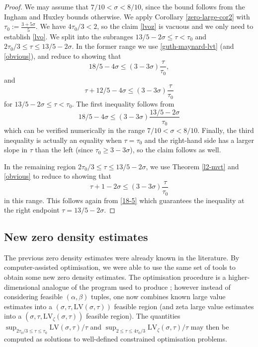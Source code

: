 \documentclass[a4paper, 10pt]{amsart}
\newcommand{\LV}{\mathrm{LV}}
\begin{document}
\begin{proof} We may assume that $7/10 < \sigma < 8/10$, since the bound follows from the Ingham and Huxley bounds otherwise.  We apply Corollary \ref{zero-large-cor2} with $\tau_0 := \frac{3+5\sigma}{5}$.  We have $4\tau_0/3 < 2$, so the claim \eqref{lvoz} is vacuous and we only need to establish \eqref{lvo}.  We split into the subranges $13/5-2\sigma \leq \tau < \tau_0$ and $2\tau_0/3 \leq \tau \leq 13/5-2\sigma$. In the former range we use \eqref{guth-maynard-lvt} (and \eqref{obvious}), and reduce to showing that
$$ 18/5 - 4 \sigma \leq (3-3\sigma) \frac{\tau}{\tau_0},$$
and
$$ \tau + 12/5 - 4\sigma \leq (3-3\sigma) \frac{\tau}{\tau_0}$$
for $13/5-2\sigma \leq \tau < \tau_0$.  The first inequality follows from
\begin{equation}\label{18-5}
 18/5 - 4 \sigma \leq (3-3\sigma) \frac{13/5-2\sigma}{\tau_0}
\end{equation}
which can be verified numerically in the range $7/10 < \sigma < 8/10$.  Finally, the third inequality is actually an equality when $\tau=\tau_0$ and the right-hand side has a larger slope in $\tau$ than the left (since $\tau_0 \geq 3-3\sigma$), so the claim follows as well.

In the remaining region $2\tau_0/3 \leq \tau \leq 13/5-2\sigma$, we use Theorem \ref{l2-mvt} and \eqref{obvious} to reduce to showing that
$$ \tau + 1 - 2\sigma \leq (3-3\sigma) \frac{\tau}{\tau_0}$$
in this range.  This follows again from \eqref{18-5} which guarantees the inequality at the right endpoint $\tau = 13/5-2\sigma$.
\end{proof}

\subsection{New zero density estimates}

The previous zero density estimates were already known in the literature.  By computer-assisted optimisation, we were able to use the same set of tools to obtain some new zero density estimates.  The optimisation procedure is a higher-dimensional analogue of the program used to produce ; however instead of considering feasible $(\alpha, \beta)$ tuples, one now combines known large value estimates into a $(\sigma, \tau, \LV(\sigma, \tau))$ feasible region (and zeta large value estimates into a $(\sigma, \tau, \LV_\zeta(\sigma,\tau))$ feasible region).  The quantities $\sup_{2\tau_0/3\le\tau\le\tau_0}\LV(\sigma, \tau)/\tau$ and $\sup_{2\le\tau\le4\tau_0/3}\LV_\zeta(\sigma,\tau)/\tau$ may then be computed as solutions to well-defined constrained optimisation problems. 
\end{document}
